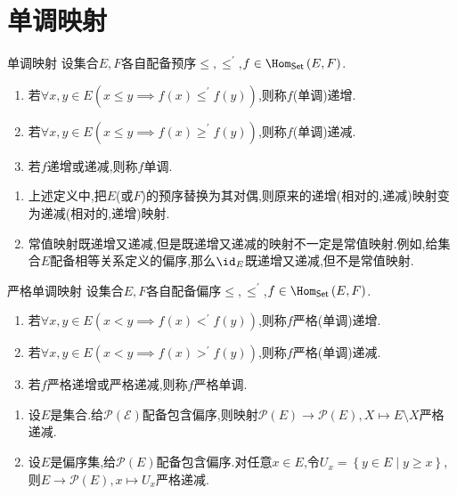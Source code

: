 \section{单调映射}

\begin{definition}{单调映射}{}
	设集合$E,F$各自配备预序$\leq,\leq^{\prime}$,$f\in\Hom_{\mathsf{Set}}\left(E,F\right)$.
	\begin{enumerate}
		\item 若$\forall x,y\in E\left(x\leq y\implies f\left(x\right)\leq^{\prime}f\left(y\right)\right)$,则称$f$(单调)递增.
		\item 若$\forall x,y\in E\left(x\leq y\implies f\left(x\right)\geq^{\prime}f\left(y\right)\right)$,则称$f$(单调)递减.
		\item 若$f$递增或递减,则称$f$单调.
	\end{enumerate}
\end{definition}

\begin{remark}{}{}
	\begin{enumerate}
	\item 上述定义中,把$E$(或$F$)的预序替换为其对偶,则原来的递增(相对的,递减)映射变为递减(相对的,递增)映射.
	\item 常值映射既递增又递减,但是既递增又递减的映射不一定是常值映射.例如,给集合$E$配备相等关系定义的偏序,那么$\id_{E}$既递增又递减,但不是常值映射.
	\end{enumerate}
\end{remark}

\begin{definition}{严格单调映射}{}
	设集合$E,F$各自配备偏序$\leq,\leq^{\prime}$,$f\in\Hom_{\mathsf{Set}}\left(E,F\right)$.
	\begin{enumerate}
		\item 若$\forall x,y\in E\left(x<y\implies f\left(x\right)<^{\prime}f\left(y\right)\right)$,则称$f$严格(单调)递增.
		\item 若$\forall x,y\in E\left(x<y\implies f\left(x\right)>^{\prime}f\left(y\right)\right)$,则称$f$严格(单调)递减.
		\item 若$f$严格递增或严格递减,则称$f$严格单调.
	\end{enumerate}
\end{definition}

\begin{example}{}{}
	\begin{enumerate}
		\item 设$E$是集合.给$\mathcal{P}\left(\mathcal{E}\right)$配备包含偏序,则映射$\mathcal{P}\left(E\right)\to\mathcal{P}\left(E\right),X\mapsto E\setminus X$严格递减.
		\item 设$E$是偏序集,给$\mathcal{P}\left(E\right)$配备包含偏序.对任意$x\in E$,令$U_{x}=\left\{y\in E\middle|y\geq x\right\}$,则$E\to\mathcal{P}\left(E\right),x\mapsto U_{x}$严格递减.
	\end{enumerate}
\end{example}

